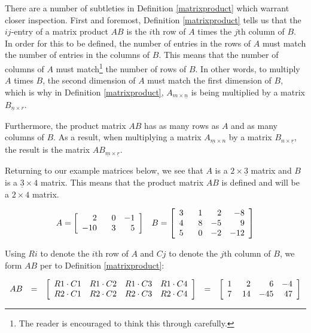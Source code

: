 \documentclass{ximera}
\begin{document}
There are a number of subtleties in Definition \ref{matrixproduct} which warrant closer inspection. First and foremost, Definition \ref{matrixproduct} tells us that the $ij$-entry of a matrix product $AB$ is the $i$th row of $A$ times the $j$th column of $B$.  In order for this to be defined, the number of entries in the rows of $A$ must match the number of entries in the columns of $B$. This means that the number of columns of $A$ must match\footnote{The reader is encouraged to think this through carefully.} the number of rows of $B$.  In other words, to multiply $A$ times $B$, the second dimension of $A$ must match the first dimension of $B$, which is why in Definition \ref{matrixproduct}, $A_{m \times \underline{n}}$ is being multiplied by a matrix $B_{\underline{n} \times r}$.  

Furthermore, the product matrix $AB$ has as many rows as $A$ and as many columns of $B$. As a result, when multiplying a matrix $A_{\underline{m} \times n}$ by a matrix $B_{n \times \underline{r}}$, the result is the matrix  $AB_{\underline{m} \times \underline{r}}$. 

Returning to our example matrices below, we see that $A$ is a $2 \times \underline{3}$ matrix and $B$ is a $\underline{3} \times 4$ matrix.  This means that the product matrix $AB$ is defined and will be a $2 \times 4$ matrix.

\[ \begin{array}{cc}

A = \left[\begin{array}{rrr} 2 & \hphantom{-}0 & -1 \\ -10 & 3 & 5 \\ \end{array} \right]

&

B = \left[\begin{array}{rrrr} 3 & \hphantom{-}1 & 2 & -8 \\ 4 & 8 & -5 & 9  \\ 5 & 0 & -2 & -12 \\  \end{array} \right]

\end{array}\]


Using $Ri$ to denote the $i$th row of $A$ and $Cj$ to denote the $j$th column of $B$, we form $AB$ per to Definition \ref{matrixproduct}:

\[ \begin{array}{rclcl}

AB & = & \left[\begin{array}{rrrr} R1 \cdot C1 &   R1 \cdot C2 & R1 \cdot C3 & R1 \cdot C4 \\ R2 \cdot C1 &   R2 \cdot C2 & R2 \cdot C3 & R2 \cdot C4 \\  \end{array} \right] & = & \left[\begin{array}{rrrr} 1 &  \hphantom{-}2 & 6 & -4 \\ 7 &  14 & -45 & 47 \\  \end{array} \right] \\ \end{array} \]
\end{document}
